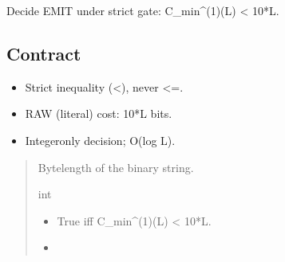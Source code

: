\documentclass[letterpaper,10pt,english]{sphinxmanual}
\begin{document}

\begin{fulllineitems}
\label{\detokenize{clf_calculator:clf_calculator.should_emit}}
\pysigstartsignatures
\pysiglinewithargsret
{}
{}
{}
\pysigstopsignatures
\sphinxAtStartPar
Decide EMIT under strict gate: C\_min\textasciicircum{}(1)(L) \textless{} 10*L.


\subsection{Contract}
\label{\detokenize{clf_calculator:id2}}\begin{itemize}
\item {} 
\sphinxAtStartPar
Strict inequality (\textless{}), never \textless{}=.

\item {} 
\sphinxAtStartPar
RAW (literal) cost: 10*L bits.

\item {} 
\sphinxAtStartPar
Integer\sphinxhyphen{}only decision; O(log L).

\end{itemize}
\begin{quote}\begin{description}
\sphinxAtStartPar
{}

\sphinxAtStartPar
Byte\sphinxhyphen{}length of the binary string.

\sphinxAtStartPar
int

\sphinxAtStartPar
{}

\begin{itemize}
\item {} 
\sphinxAtStartPar
{} \textendash{} True iff C\_min\textasciicircum{}(1)(L) \textless{} 10*L.

\item {} 
\sphinxAtStartPar
{}


\end{itemize}
\end{description}
\end{quote}
\end{fulllineitems}
\end{document}
